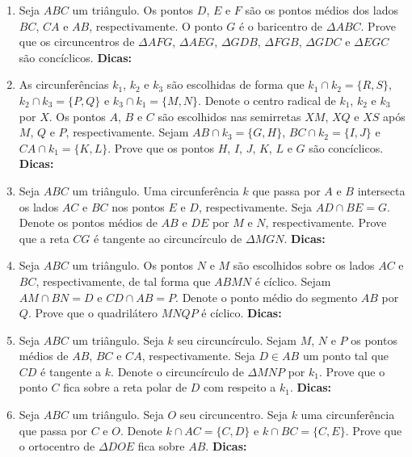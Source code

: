 \documentclass{article}
\newcommand{\dica}{\textbf{Dicas:}}
\newcommand{\iniTri}{Seja $ABC$ um triângulo}
\begin{document}
\begin{multicols}{2}
\begin{enumerate}
    \item \iniTri. Os pontos $D$, $E$ e $F$ são os pontos médios dos lados $BC$, $CA$ e $AB$, respectivamente. O ponto $G$ é o baricentro de $\Delta ABC$. Prove que os circuncentros de $\Delta AFG$, $\Delta AEG$, $\Delta GDB$, $\Delta FGB$, $\Delta GDC$ e $\Delta EGC$ são concíclicos. \dica %
    
    \item As circunferências $k_1$, $k_2$ e $k_3$ são escolhidas de forma que $k_1\cap k_2=\{R,S\}$, $k_2\cap k_3=\{P,Q\}$ e $k_3\cap k_1=\{M,N\}$. Denote o centro radical de $k_1$, $k_2$ e $k_3$ por $X$. Os pontos $A$, $B$ e $C$ são escolhidos nas semirretas $XM$, $XQ$ e $XS$ após $M$, $Q$ e $P$, respectivamente. Sejam $AB\cap k_3=\{G,H\}$, $BC\cap k_2=\{I,J\}$ e $CA\cap k_1=\{K,L\}$. Prove que os pontos $H$, $I$, $J$, $K$, $L$ e $G$ são concíclicos. \dica %
    
    \item \iniTri. Uma circunferência $k$ que passa por $A$ e $B$ intersecta os lados $AC$ e $BC$ nos pontos $E$ e $D$, respectivamente. Seja $AD\cap BE=G$. Denote os pontos médios de $AB$ e $DE$ por $M$ e $N$, respectivamente. Prove que a reta $CG$ é tangente ao circuncírculo de $\Delta MGN$. \dica %
    
    \item \iniTri. Os pontos $N$ e $M$ são escolhidos sobre os lados $AC$ e $BC$, respectivamente, de tal forma que $ABMN$ é cíclico. Sejam $AM\cap BN=D$ e $CD\cap AB=P$. Denote o ponto médio do segmento $AB$ por $Q$. Prove que o quadrilátero $MNQP$ é cíclico. \dica %
    
    \item \iniTri. Seja $k$ seu circuncírculo. Sejam $M$, $N$ e $P$ os pontos médios de $AB$, $BC$ e $CA$, respectivamente. Seja $D\in AB$ um ponto tal que $CD$ é tangente a $k$. Denote o circuncírculo de $\Delta MNP$ por $k_1$. Prove que o ponto $C$ fica sobre a reta polar de $D$ com respeito a $k_1$. \dica %
    
    \item \iniTri. Seja $O$ seu circuncentro. Seja $k$ uma circunferência que passa por $C$ e $O$. Denote $k\cap AC=\{C,D\}$ e $k\cap BC=\{C,E\}$. Prove que o ortocentro de $\Delta DOE$ fica sobre $AB$. \dica %
    

\end{enumerate}
\end{multicols}
\end{document}
